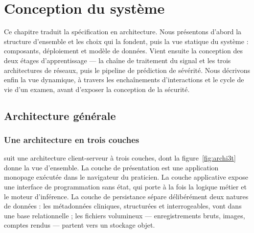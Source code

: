 \chapter{Conception du système}
\label{chap:conception}

Ce chapitre traduit la spécification en architecture. Nous présentons d'abord la
structure d'ensemble et les choix qui la fondent, puis la vue statique du système :
composants, déploiement et modèle de données. Vient ensuite la conception des deux
étages d'apprentissage — la chaîne de traitement du signal et les trois architectures
de réseaux, puis le pipeline de prédiction de sévérité. Nous décrivons enfin la vue
dynamique, à travers les enchaînements d'interactions et le cycle de vie d'un examen,
avant d'exposer la conception de la sécurité.

\section{Architecture générale}

\subsection{Une architecture en trois couches}

\hypnoria{} suit une architecture client-serveur à trois couches, dont la
figure~\ref{fig:archi3t} donne la vue d'ensemble. La couche de présentation est une
application monopage exécutée dans le navigateur du praticien. La couche applicative
expose une interface de programmation sans état, qui porte à la fois la logique métier
et le moteur d'inférence. La couche de persistance sépare délibérément deux natures de
données : les métadonnées cliniques, structurées et interrogeables, vont dans une base
relationnelle ; les fichiers volumineux — enregistrements bruts, images, comptes
rendus — partent vers un stockage objet.

